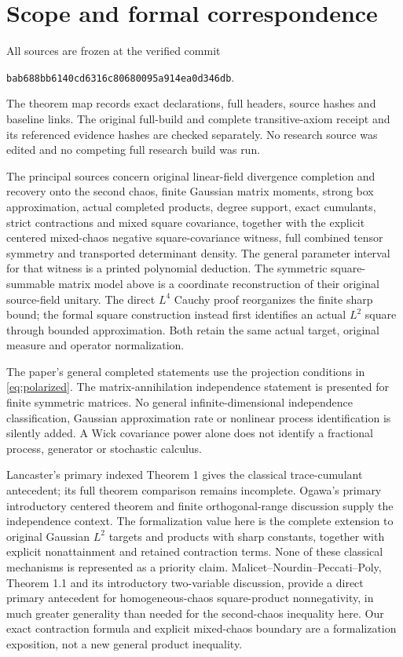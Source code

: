 \documentclass[11pt]{article}
\begin{document}
\section{Scope and formal correspondence}
All sources are frozen at the verified commit
\begin{center}\texttt{\small bab688bb6140cd6316c80680095a914ea0d346db}.\end{center}
The theorem map records exact declarations, full headers, source
hashes and baseline links. The original full-build and complete
transitive-axiom receipt and its referenced evidence hashes are
checked separately. No research source was edited and no competing
full research build was run.

The principal sources concern original linear-field divergence
completion and recovery onto the second chaos, finite Gaussian
matrix moments, strong box approximation, actual completed products,
degree support, exact cumulants, strict contractions and mixed square
covariance, together with the explicit centered mixed-chaos
negative square-covariance witness, full combined tensor symmetry
and transported determinant density. The general parameter interval
for that witness is a printed polynomial deduction. The symmetric
square-summable matrix model above is a
coordinate reconstruction of their original source-field unitary.
The direct $L^4$ Cauchy proof reorganizes the finite sharp bound;
the formal square construction instead first identifies an actual
$L^2$ square through bounded approximation. Both retain the same
actual target, original measure and operator normalization.

The paper's general completed statements use the projection
conditions in \eqref{eq:polarized}. The matrix-annihilation
independence statement is presented for finite symmetric matrices.
No general infinite-dimensional independence classification,
Gaussian approximation rate or nonlinear process identification is
silently added. A Wick covariance power alone does not identify a
fractional process, generator or stochastic calculus.

Lancaster's primary indexed Theorem 1 gives the classical
trace-cumulant antecedent; its full theorem comparison remains
incomplete. Ogawa's primary introductory centered theorem and
finite orthogonal-range discussion supply the independence context.
The formalization value here is the complete extension to original
Gaussian $L^2$ targets and products with sharp constants, together
with explicit nonattainment and retained contraction terms. None
of these classical mechanisms is represented as a priority claim.
Malicet--Nourdin--Peccati--Poly, Theorem 1.1 and its introductory
two-variable discussion, provide a direct primary antecedent for
homogeneous-chaos square-product nonnegativity, in much greater
generality than needed for the second-chaos inequality here.
Our exact contraction formula and explicit mixed-chaos boundary
are a formalization exposition, not a new general product inequality.
\end{document}
